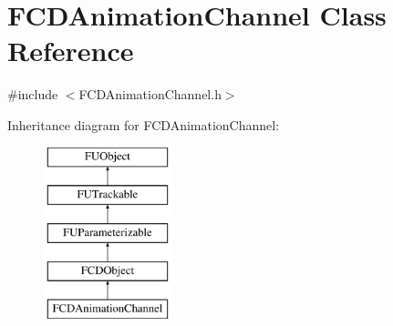 \hypertarget{classFCDAnimationChannel}{
\section{FCDAnimationChannel Class Reference}
\label{classFCDAnimationChannel}
}


{\ttfamily \#include $<$FCDAnimationChannel.h$>$}

Inheritance diagram for FCDAnimationChannel:\begin{figure}[H]
\begin{center}
\leavevmode
\includegraphics[height=5.000000cm]{classFCDAnimationChannel}
\end{center}
\end{figure}
